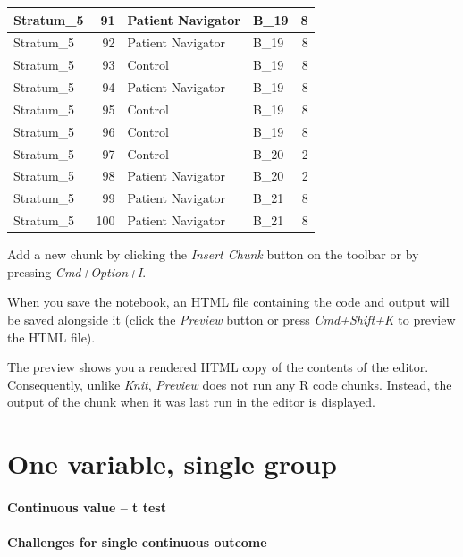 \documentclass[
]{book}
\begin{document}
\begin{table}[H]
\begin{tabular}{l|r|l|l|r}
\hline
Stratum\_5 & 91 & Patient Navigator & B\_19 & 8\\
\hline
Stratum\_5 & 92 & Patient Navigator & B\_19 & 8\\
\hline
Stratum\_5 & 93 & Control & B\_19 & 8\\
\hline
Stratum\_5 & 94 & Patient Navigator & B\_19 & 8\\
\hline
Stratum\_5 & 95 & Control & B\_19 & 8\\
\hline
Stratum\_5 & 96 & Control & B\_19 & 8\\
\hline
Stratum\_5 & 97 & Control & B\_20 & 2\\
\hline
Stratum\_5 & 98 & Patient Navigator & B\_20 & 2\\
\hline
Stratum\_5 & 99 & Patient Navigator & B\_21 & 8\\
\hline
Stratum\_5 & 100 & Patient Navigator & B\_21 & 8\\
\hline
\end{tabular}
\end{table}

Add a new chunk by clicking the \emph{Insert Chunk} button on the toolbar or by pressing \emph{Cmd+Option+I}.

When you save the notebook, an HTML file containing the code and output will be saved alongside it (click the \emph{Preview} button or press \emph{Cmd+Shift+K} to preview the HTML file).

The preview shows you a rendered HTML copy of the contents of the editor. Consequently, unlike \emph{Knit}, \emph{Preview} does not run any R code chunks. Instead, the output of the chunk when it was last run in the editor is displayed.

\hypertarget{one-variable-single-group}{%
\chapter{One variable, single group}\label{one-variable-single-group}}

\hypertarget{continuous-value-t-test}{%
\subsubsection{Continuous value -- t test}\label{continuous-value-t-test}}

\hypertarget{challenges-for-single-continuous-outcome}{%
\subsubsection{Challenges for single continuous outcome}\label{challenges-for-single-continuous-outcome}}
\end{document}

